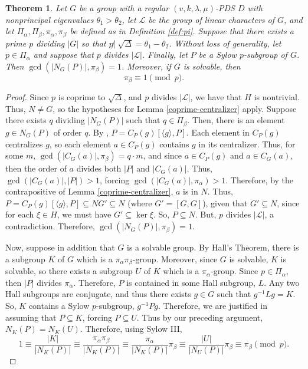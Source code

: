 \documentclass[12pt]{amsproc} %
\newtheorem{thm}{Theorem}[section]
\theoremstyle{definition}\newtheorem{defn}[thm]{Definition}
\theoremstyle{definition}\newtheorem{rem}[thm]{Remark}
\theoremstyle{definition}\newtheorem{ex}[thm]{Example}
\begin{document}
\begin{thm}\label{mod-restriction}
    Let $G$ be a group with a regular $(v, k, \lambda, \mu)$-PDS $D$ with nonprincipal eigenvalues $\theta_1 > \theta_2$, let $\mathcal{L}$ be the group of linear characters of $G$, and let $\Pi_\alpha, \Pi_\beta, \pi_\alpha, \pi_\beta$ be defined as in Definition \ref{def:pi}.  Suppose that there exists a prime $p$ dividing $|G|$ so that $p\not|\;\sqrt\Delta = \theta_1 - \theta_2$. Without loss of generality, let $p\in\Pi_\alpha$ and suppose that $p$ divides $|\mathcal{L}|$. Finally, let $P$ be a Sylow $p$-subgroup of $G$. Then $\gcd(|N_G(P)|, \pi_\beta) = 1$. Moreover, if $G$ is solvable, then
	\[ \pi_\beta \equiv 1\pmod p. \]
\end{thm}
	\begin{proof}
		Since $p$ is coprime to $\sqrt\Delta$, and $p$ divides $|\mathcal{L}|$, we have that $H$ is nontrivial. Thus, $N \neq G$, so the hypotheses for Lemma \ref{coprime-centralizer} apply. Suppose there exists $q$ dividing $|N_G(P)|$ such that $q\in\Pi_\beta$. Then, there is an element $g\in N_G(P)$ of order $q$. By \cite[Theorem 3.5]{gorenstein}, $P = C_P(g)[\langle g\rangle, P]$. Each element in $C_P(g)$ centralizes $g$, so each element $a\in C_P(g)$ contains $g$ in its centralizer. Thus, for some $m$, $\gcd(|C_G(a)|, \pi_\beta) = q\cdot m$, and since $a \in C_P(g)$ and $a \in C_G(a)$, then the order of $a$ divides both $|P|$ and $|C_G(a)|$. Thus, $\gcd(|C_G(a)|, |P|) > 1$, forcing $\gcd(|C_G(a)|, \pi_\alpha) > 1$. Therefore, by the contrapositive of Lemma \ref{coprime-centralizer}, $a$ is in $N$. Thus, $P = C_P(g)[\langle g\rangle, P] \subseteq N G' \subseteq N$ (where $G' = [G,G]$), given that $G' \subseteq N$, since for each $\xi \in H$, we must have $G' \subseteq \ker\xi$. So, $P \subseteq N$. But, $p$ divides $|\mathcal{L}|$, a contradiction. Therefore, $\gcd(|N_G(P)|, \pi_\beta) = 1$.



	Now, suppose in addition that $G$ is a solvable group. By Hall's Theorem, there is a subgroup $K$ of $G$ which is a $\pi_\alpha\pi_\beta$-group. Moreover, since $G$ is solvable, $K$ is solvable, so there exists a subgroup $U$ of $K$ which is a $\pi_\alpha$-group. Since $p \in \Pi_\alpha$, then $|P|$ divides $\pi_\alpha$. Therefore, $P$ is contained in some Hall subgroup, $L$. Any two Hall subgroups are conjugate, and thus there exists $g \in G$ such that $g^{-1}Lg = K$. So, $K$ contains a Sylow $p$-subgroup, $g^{-1}Pg$. Therefore, we are justified in assuming that $P \subseteq K$, forcing $P \subseteq U$. Thus by our preceding argument, $N_K(P) = N_K(U)$. Therefore, using Sylow III,
		\begin{equation*}
		1\equiv \frac{|K|}{|N_K(P)|}\equiv \frac{\pi_\alpha \pi_\beta}{|N_K(P)|} \equiv \frac{\pi_\alpha}{|N_K(P)|}\pi_\beta\equiv \frac{|U|}{|N_U(P)|}\pi_\beta \equiv \pi_\beta \pmod p.
		\end{equation*}
	\end{proof}
\end{document}
